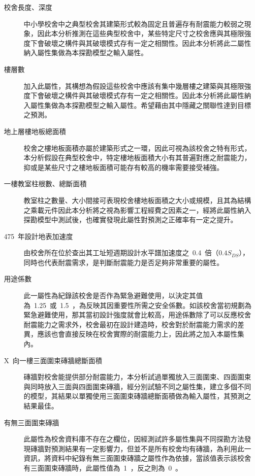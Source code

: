 \begin{description}
  \item[校舍長度、深度]
  中小學校舍中之典型校舍其建築形式較為固定且普遍存有耐震能力較弱之現象，因此本分析推測在這些典型校舍中，某些特定尺寸之校舍應與其極限強度下會破壞之構件與其破壞模式存有一定之相關性。因此本分析將此二屬性納入屬性集做為本探勘模型之輸入屬性。
  \item[樓層數]
  加入此屬性，其構想為假設這些校舍中應該有集中幾層樓之建築與其極限強度下會破壞之構件與其破壞模式存有一定之相關性。因此本分析將此屬性納入屬性集做為本探勘模型之輸入屬性。希望藉由其中隱藏之關聯性達到目標之預測。
  \item[地上層樓地板總面積]
  校舍之樓地板面積亦屬於建築形式之一環，因此可視為該校舍之特有形式，本分析假設在典型校舍中，特定樓地板面積大小有其普遍對應之耐震能力，抑或是某些尺寸之樓地板面積可能存有較高的機率需要接受補強。
  \item[一樓教室柱根數、總斷面積]
  教室柱之數量、大小間接可表現校舍樓地板面積之大小或規模，且其為結構之乘載元件因此本分析將之視為影響工程經費之因素之一，經將此屬性納入探勘模型中測試後，也確實發現此屬性對預測之正確率有一定之提升。
  \item[475~年設計地表加速度]
  由校舍所在位於查出其工址短週期設計水平譜加速度之~0.4~倍（$0.4S_{DS}$），同時也代表耐震需求，是判斷耐震能力是否足夠非常重要的屬性。
  \item[用途係數]
  此一屬性為紀錄該校舍是否作為緊急避難使用，以決定其值為~1.25~或~1.5~，為反映其因重要性所需之安全係數。如該校舍當初規劃為緊急避難使用，那其當初設計強度就會比較高，用途係數除了可以反應校舍耐震能力之需求外，校舍最初在設計建造時，校舍對於耐震能力需求的差異，應該也會直接反映在校舍實際的耐震能力上，因此將之加入本屬性集內。
  \item[X~向一樓三面圍束磚牆總斷面積]
  磚牆對校舍能提供部分耐震能力，本分析試過單獨放入三面圍束、四面圍束與同時放入三面與四面圍束磚牆，經分別試驗不同之屬性集，建立多個不同的模型，其結果以單獨使用三面圍束磚牆總斷面積做為輸入屬性，其預測之結果最佳。
  \item[有無三面圍束磚牆]
  此屬性為校舍資料庫不存在之欄位，因經測試許多屬性集與不同探勘方法發現磚牆對預測結果有一定影響力，但並不是所有校舍均有磚牆，為利用此一資訊，將資料中紀錄有無三面圍束磚牆之屬性作為依據，當該值表示該校舍有三面圍束磚牆時，此屬性值為~1~，反之則為~0~。

\end{description}
